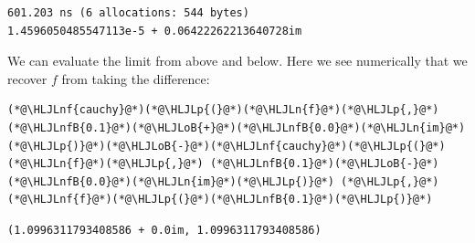 \documentclass[12pt,a4paper]{article}
\newcommand{\HLJLn}[1]{#1}
\newcommand{\HLJLnf}[1]{\textcolor[RGB]{66,102,213}{#1}}
\newcommand{\HLJLnfB}[1]{\textcolor[RGB]{59,151,46}{#1}}
\newcommand{\HLJLoB}[1]{\textcolor[RGB]{102,102,102}{\textbf{#1}}}
\newcommand{\HLJLp}[1]{#1}
\begin{document}
\begin{lstlisting}
601.203 ns (6 allocations: 544 bytes)
1.4596050485547113e-5 + 0.06422262213640728im
\end{lstlisting}


We can evaluate the limit from above and below. Here we see numerically that we recover $f$ from taking the difference:


\begin{lstlisting}
(*@\HLJLnf{cauchy}@*)(*@\HLJLp{(}@*)(*@\HLJLn{f}@*)(*@\HLJLp{,}@*) (*@\HLJLnfB{0.1}@*)(*@\HLJLoB{+}@*)(*@\HLJLnfB{0.0}@*)(*@\HLJLn{im}@*)(*@\HLJLp{)}@*)(*@\HLJLoB{-}@*)(*@\HLJLnf{cauchy}@*)(*@\HLJLp{(}@*)(*@\HLJLn{f}@*)(*@\HLJLp{,}@*) (*@\HLJLnfB{0.1}@*)(*@\HLJLoB{-}@*)(*@\HLJLnfB{0.0}@*)(*@\HLJLn{im}@*)(*@\HLJLp{)}@*) (*@\HLJLp{,}@*) (*@\HLJLnf{f}@*)(*@\HLJLp{(}@*)(*@\HLJLnfB{0.1}@*)(*@\HLJLp{)}@*)
\end{lstlisting}

\begin{lstlisting}
(1.0996311793408586 + 0.0im, 1.0996311793408586)
\end{lstlisting}
\end{document}
